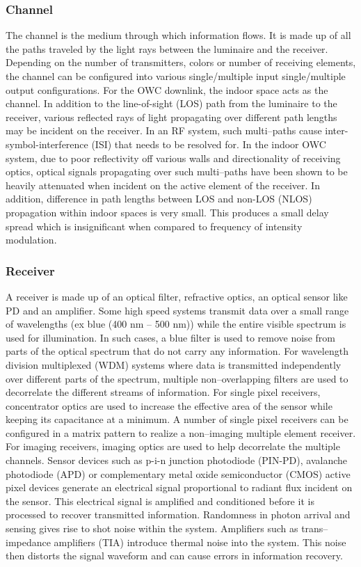 \subsubsection{Channel}
\label{subsubsec:outlineChannel}
The channel is the medium through which information flows. It is made up of all the paths traveled by the light rays between the luminaire and the receiver. Depending on the number of transmitters, colors or number of receiving elements, the channel can be configured into various single/multiple input single/multiple output configurations. For the OWC downlink, the indoor space acts as the channel. In addition to the line-of-sight (LOS) path from the luminaire to the receiver, various reflected rays of light propagating over different path lengths may be incident on the receiver. In an RF system, such multi--paths cause inter-symbol-interference (ISI) that needs to be resolved for. In the indoor OWC system, due to poor reflectivity off various walls and directionality of receiving optics, optical signals propagating over such multi--paths have been shown to be heavily attenuated when incident on the active element of the receiver. In addition, difference in path lengths between LOS and non-LOS (NLOS) propagation within indoor spaces is very small. This produces a small delay spread which is insignificant when compared to frequency of intensity modulation.

\subsubsection{Receiver}
\label{subsubsec:outlineReceiver}
A receiver is made up of an optical filter, refractive optics, an optical sensor like PD and an amplifier. Some high speed systems transmit data over a small range of wavelengths (ex blue (400 nm -- 500 nm)) while the entire visible spectrum is used for illumination. In such cases, a blue filter is used to remove noise from parts of the optical spectrum that do not carry any information. For wavelength division multiplexed (WDM) systems where data is transmitted independently over different parts of the spectrum, multiple non--overlapping filters are used to decorrelate the different streams of information. For single pixel receivers, concentrator optics are used to increase the effective area of the sensor while keeping its capacitance at a minimum. A number of single pixel receivers can be configured in a matrix pattern to realize a non--imaging multiple element receiver. For imaging receivers, imaging optics are used to help decorrelate the multiple channels. Sensor devices such as p-i-n junction photodiode (PIN-PD), avalanche photodiode (APD) or complementary metal oxide semiconductor (CMOS) active pixel devices generate an electrical signal proportional to radiant flux incident on the sensor. This electrical signal is amplified and conditioned before it is processed to recover transmitted information. Randomness in photon arrival and sensing gives rise to shot noise within the system. Amplifiers such as trans--impedance amplifiers (TIA) introduce thermal noise into the system. This noise then distorts the signal waveform and can cause errors in information recovery.

